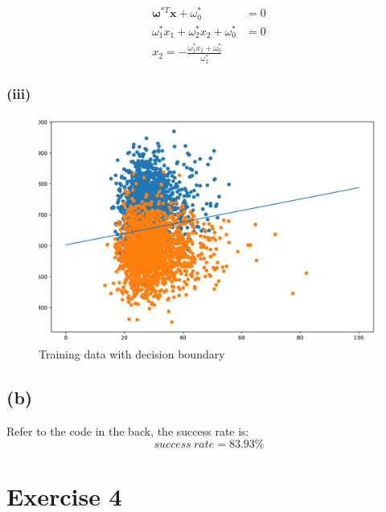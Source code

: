 \documentclass[11pt]{article}
\begin{document}
\begin{equation}
\begin{split}
\pmb{\omega}^{*T}\pmb{x}+\omega_0^*&=0\\
\omega_1^*x_1+\omega_2^*x_2+\omega_0^*&=0\\
x_2=-\frac{\omega_1^*x_1+\omega_0^*}{\omega_2^*}
\end{split}
\end{equation}
\subsubsection*{(iii)}
\begin{figure}[h]
	\centering
	\includegraphics[width=0.5\linewidth]{exercise3_2}
	\caption{Training data with decision boundary}
\end{figure}
\subsection*{(b)}
Refer to the code in the back, the success rate is:
$$success\ rate = 83.93\%$$
\pagebreak
\section*{Exercise 4}
\end{document}

